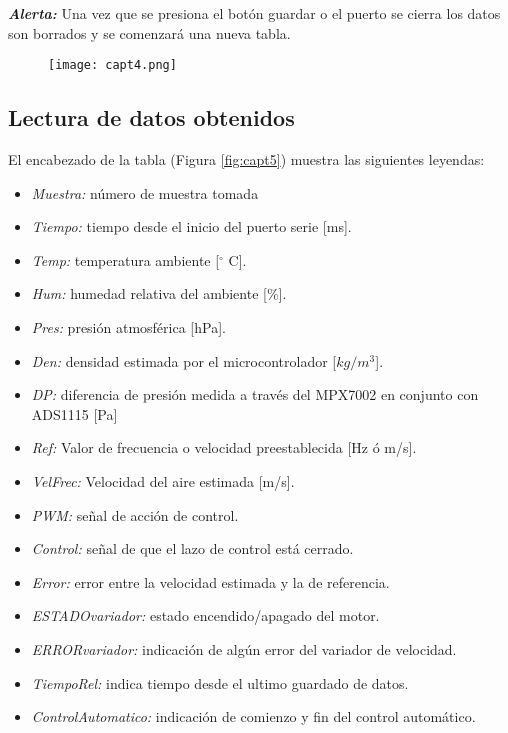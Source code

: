 \textbf{\textit{Alerta:}} Una vez que se presiona el botón guardar o el puerto se cierra los datos son borrados y se comenzará una nueva tabla.

\begin{figure}[H]
	\centering
	\texttt{[image: capt4.png]}
	\label{fig:capt4}
\end{figure}


\subsection{Lectura de datos obtenidos}
El encabezado de la tabla (Figura \ref{fig:capt5}) muestra las siguientes leyendas:

\begin{itemize}
	\item \textit{Muestra:} número de muestra tomada
	\item \textit{Tiempo:} tiempo desde el inicio del puerto serie [ms].
	\item \textit{Temp:} temperatura ambiente [$^{\circ}$ C].
	\item \textit{Hum:} humedad relativa del ambiente [\%].
	\item \textit{Pres:} presión atmosférica [hPa].
	\item \textit{Den:} densidad estimada por el microcontrolador [$kg/m^3$].
	\item \textit{DP:} diferencia de presión medida a través del MPX7002 en conjunto con ADS1115 [Pa]
	\item \textit{Ref:} Valor de frecuencia o velocidad preestablecida [Hz ó m/s].
	\item \textit{VelFrec:} Velocidad del aire estimada [m/s].
	\item \textit{PWM:} señal de acción de control.
	\item \textit{Control:} señal de que el lazo de control está cerrado.
	\item \textit{Error:} error entre la velocidad estimada y la de referencia.
	\item \textit{ESTADOvariador:} estado encendido/apagado del motor.
	\item \textit{ERRORvariador:} indicación de algún error del variador de velocidad.
	\item \textit{TiempoRel:} indica tiempo desde el ultimo guardado de datos.
	\item \textit{ControlAutomatico:} indicación de comienzo y fin del control automático.
		
\end{itemize}
